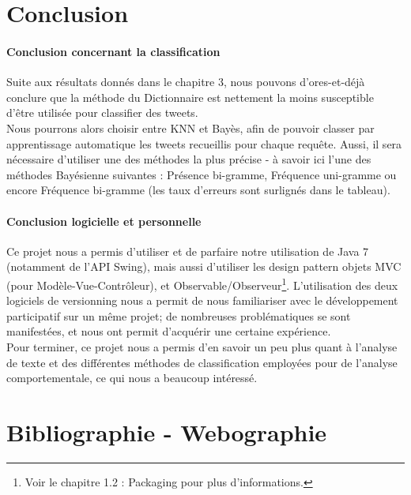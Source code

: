 \documentclass[pdftex,12pt,a4paper]{report}
\begin{document}
\begin{spacing}{1.2}
\chapter{Conclusion}

\subsubsection{Conclusion concernant la classification}

Suite aux résultats donnés dans le chapitre 3, nous pouvons d'ores-et-déjà conclure que la méthode du Dictionnaire est nettement la moins susceptible d'être utilisée pour classifier des tweets.
\\
Nous pourrons alors choisir entre KNN et Bayès, afin de pouvoir classer par apprentissage automatique les tweets recueillis pour chaque requête. Aussi, il sera nécessaire d'utiliser une des méthodes la plus précise - à savoir ici l'une des méthodes Bayésienne suivantes : Présence bi-gramme, Fréquence uni-gramme ou encore Fréquence bi-gramme (les taux d'erreurs sont surlignés dans le tableau).

\subsubsection{Conclusion logicielle et personnelle}

Ce projet nous a permis d'utiliser et de parfaire notre utilisation de Java 7 (notamment de l'API Swing), mais aussi d'utiliser les design pattern objets MVC (pour Modèle-Vue-Contrôleur), et Observable/Observeur\footnote{Voir le chapitre 1.2 : Packaging pour plus d'informations.}. L'utilisation des deux logiciels de versionning nous a permit de nous familiariser avec le développement participatif sur un même projet; de nombreuses problématiques se sont manifestées, et nous ont permit d'acquérir une certaine expérience.
\\
Pour terminer, ce projet nous a permis d'en savoir un peu plus quant à l'analyse de texte et des différentes méthodes de classification employées pour de l'analyse comportementale, ce qui nous a beaucoup intéressé.

\chapter*{Bibliographie - Webographie}

\begin{itemize}


\end{itemize}
\end{spacing}
\end{document}
